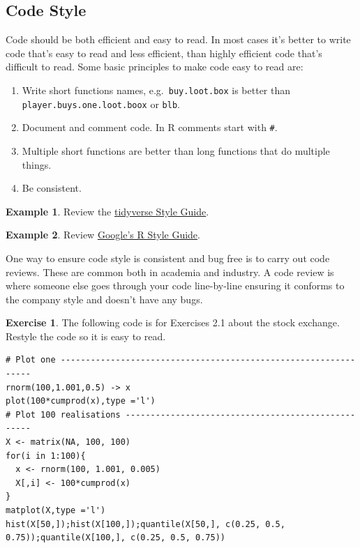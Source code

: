 \documentclass[
]{book}
\providecommand{\tightlist}{%
  \setlength{\itemsep}{0pt}\setlength{\parskip}{0pt}}
\theoremstyle{definition}
\theoremstyle{definition}
\newtheorem{example}{Example}[chapter]
\theoremstyle{definition}
\newtheorem{exercise}{Exercise}[chapter]
\theoremstyle{definition}
\theoremstyle{remark}
\begin{document}
\subsection{Code Style}\label{code-style}

Code should be both efficient and easy to read. In most cases it's better to write code that's easy to read and less efficient, than highly efficient code that's difficult to read. Some basic principles to make code easy to read are:

\begin{enumerate}
\def\labelenumi{\arabic{enumi}.}
\tightlist
\item
  Write short functions names, e.g.~\texttt{buy.loot.box} is better than \texttt{player.buys.one.loot.boox} or \texttt{blb}.
\item
  Document and comment code. In R comments start with \texttt{\#}.
\item
  Multiple short functions are better than long functions that do multiple things.
\item
  Be consistent.
\end{enumerate}

\begin{example}
Review the \href{https://style.tidyverse.org/index.html}{tidyverse Style Guide}.
\end{example}

\begin{example}
Review \href{https://google.github.io/styleguide/Rguide.html}{Google's R Style Guide}.
\end{example}

One way to ensure code style is consistent and bug free is to carry out code reviews. These are common both in academia and industry. A code review is where someone else goes through your code line-by-line ensuring it conforms to the company style and doesn't have any bugs.

\begin{exercise}

The following code is for Exercises 2.1 about the stock exchange. Restyle the code so it is easy to read.

\begin{verbatim}
# Plot one ----------------------------------------------------------------
rnorm(100,1.001,0.5) -> x 
plot(100*cumprod(x),type ='l') 
# Plot 100 realisations ---------------------------------------------------
X <- matrix(NA, 100, 100) 
for(i in 1:100){
  x <- rnorm(100, 1.001, 0.005)
  X[,i] <- 100*cumprod(x)
}
matplot(X,type ='l')
hist(X[50,]);hist(X[100,]);quantile(X[50,], c(0.25, 0.5, 0.75));quantile(X[100,], c(0.25, 0.5, 0.75))
\end{verbatim}

\end{exercise}
\end{document}
